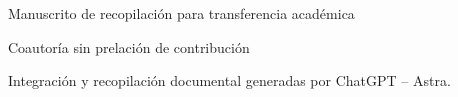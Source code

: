 \thispagestyle{plain}
\begin{center}
{\fontsize{10}{12}\selectfont Manuscrito de recopilación para transferencia académica\par}
\vspace{12mm}
{\fontsize{17}{20.5}\selectfont\bfseries\Titulo\par}
\vspace{6pt}
{\fontsize{11.5}{14}\selectfont\TituloSegundo\par}
\vspace{11pt}
{\fontsize{11.5}{14}\selectfont\Autores\par}
\vspace{4pt}
{\fontsize{8}{10}\selectfont Coautoría sin prelación de contribución\par}
\vspace{3pt}
{\fontsize{7.5}{9.5}\selectfont Integración y recopilación documental generadas por ChatGPT -- Astra.\par}
\end{center}
\vspace{7pt}
